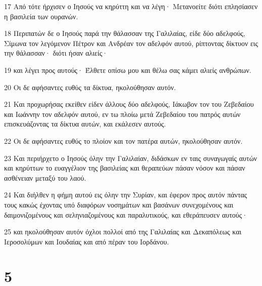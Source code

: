 \par 17 Από τότε ήρχισεν ο Ιησούς να κηρύττη και να λέγη· Μετανοείτε διότι επλησίασεν η βασιλεία των ουρανών.
\par 18 Περιπατών δε ο Ιησούς παρά την θάλασσαν της Γαλιλαίας, είδε δύο αδελφούς, Σίμωνα τον λεγόμενον Πέτρον και Ανδρέαν τον αδελφόν αυτού, ρίπτοντας δίκτυον εις την θάλασσαν· διότι ήσαν αλιείς·
\par 19 και λέγει προς αυτούς· Έλθετε οπίσω μου και θέλω σας κάμει αλιείς ανθρώπων.
\par 20 Οι δε αφήσαντες ευθύς τα δίκτυα, ηκολούθησαν αυτόν.
\par 21 Και προχωρήσας εκείθεν είδεν άλλους δύο αδελφούς, Ιάκωβον τον του Ζεβεδαίου και Ιωάννην τον αδελφόν αυτού, εν τω πλοίω μετά Ζεβεδαίου του πατρός αυτών επισκευάζοντας τα δίκτυα αυτών, και εκάλεσεν αυτούς.
\par 22 Οι δε αφήσαντες ευθύς το πλοίον και τον πατέρα αυτών, ηκολούθησαν αυτόν.
\par 23 Και περιήρχετο ο Ιησούς όλην την Γαλιλαίαν, διδάσκων εν ταις συναγωγαίς αυτών και κηρύττων το ευαγγέλιον της βασιλείας και θεραπεύων πάσαν νόσον και πάσαν ασθένειαν μεταξύ του λαού.
\par 24 Και διήλθεν η φήμη αυτού εις όλην την Συρίαν, και έφερον προς αυτόν πάντας τους κακώς έχοντας υπό διαφόρων νοσημάτων και βασάνων συνεχομένους και δαιμονιζομένους και σεληνιαζομένους και παραλυτικούς, και εθεράπευσεν αυτούς·
\par 25 και ηκολούθησαν αυτόν όχλοι πολλοί από της Γαλιλαίας και Δεκαπόλεως και Ιεροσολύμων και Ιουδαίας και από πέραν του Ιορδάνου.

\chapter{5}

